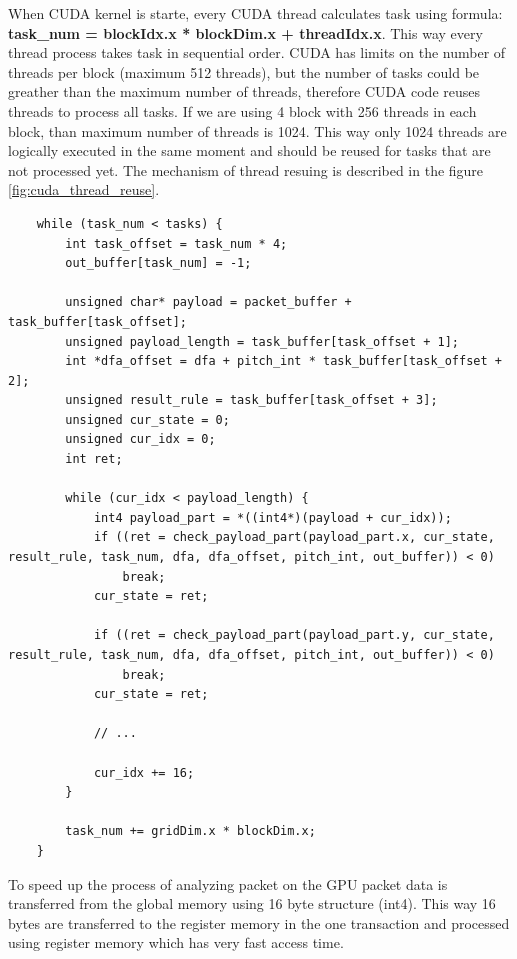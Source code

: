 \documentclass[thesis=M,english]{FITthesis}[2011/07/15]
\begin{document}
When CUDA kernel is starte, every CUDA thread calculates task using formula: \textbf{task\_num = blockIdx.x * blockDim.x + threadIdx.x}. This way every thread process takes task in sequential order. CUDA has limits on the number of threads per block (maximum 512 threads), but the number of tasks could be greather than the maximum number of threads, therefore CUDA code reuses threads to process all tasks. If we are using 4 block with 256 threads in each block, than maximum number of threads is 1024. This way only 1024 threads are logically executed in the same moment and should be reused for tasks that are not processed yet. The mechanism of thread resuing is described in the figure \ref{fig:cuda_thread_reuse}.

\begin{lstlisting}
    while (task_num < tasks) {
        int task_offset = task_num * 4;
        out_buffer[task_num] = -1;

        unsigned char* payload = packet_buffer + task_buffer[task_offset];
        unsigned payload_length = task_buffer[task_offset + 1];
        int *dfa_offset = dfa + pitch_int * task_buffer[task_offset + 2];
        unsigned result_rule = task_buffer[task_offset + 3];
        unsigned cur_state = 0;
        unsigned cur_idx = 0;
        int ret;

        while (cur_idx < payload_length) {
            int4 payload_part = *((int4*)(payload + cur_idx));
            if ((ret = check_payload_part(payload_part.x, cur_state, result_rule, task_num, dfa, dfa_offset, pitch_int, out_buffer)) < 0)
                break;
            cur_state = ret;

            if ((ret = check_payload_part(payload_part.y, cur_state, result_rule, task_num, dfa, dfa_offset, pitch_int, out_buffer)) < 0)
                break;
            cur_state = ret;

            // ...

            cur_idx += 16;
        }

        task_num += gridDim.x * blockDim.x;
    }
\end{lstlisting}

To speed up the process of analyzing packet on the GPU packet data is transferred from the global memory using 16 byte structure (int4). This way 16 bytes are transferred to the register memory in the one transaction and processed using register memory which has very fast access time.
\end{document}
